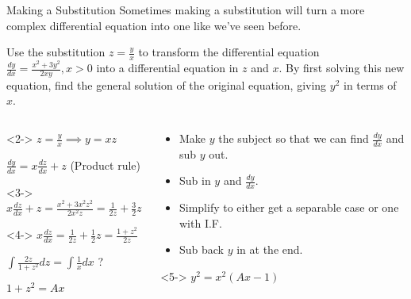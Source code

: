 \documentclass[8pt]{beamer}
\begin{document}
\begin{frame}[shrink]{Making a Substitution}
	Sometimes making a substitution will turn a more complex differential equation into one like we've seen before.

	\begin{problem}
		Use the substitution $z=\frac{y}{x}$ to transform the differential equation $\frac{dy}{dx}=\frac{x^2+3y^2}{ 2xy}, x>0$ into a differential equation in $z$ and $x$. By first solving this new equation, find the general solution of the original equation, giving $y^2$ in terms of $x$.
	\end{problem}

	\begin{columns}
	\begin{column}{.6\linewidth}
	\begin{solution}<2->
		$z=\frac{y}{x} \implies y=xz$

		$\frac{dy}{dx}= x \frac{dz}{dx}+z$ (Product rule)
	\end{solution}
	\begin{solution}<3->
		$x \frac{dz}{dx}+z=\frac{x^2+3x^2z^2}{ 2x^2z}=\frac{1}{2z}+\frac{3}{2}z$
	\end{solution}
	\begin{solution}<4->
		$x \frac{dz}{dx}=\frac{1}{2z}+\frac{1}{2}z=\frac{1+z^2}{2z}$ 

		$\int \frac{2z}{1+z^2} dz=\int \frac{1}{x}dx$ ?

$1+z^2=Ax$

	\end{solution}
	\end{column}
	\begin{column}{.4\linewidth}
		\begin{itemize}
			\item<2-> Make $y$ the subject so that we can find  $\frac{dy}{dx}$ and sub $y$ out.
				\item<3-> Sub in $y$ and  $\frac{dy}{dx}$.
				\item<4-> Simplify to either get a separable case or one with I.F.
				\item<5-> Sub back $y$ in at the end.
		\end{itemize}
	\begin{solution}<5->
		$y^2=x^2(Ax-1)$
	\end{solution}
	\end{column}
	\end{columns}
	
\end{frame}
\end{document}
